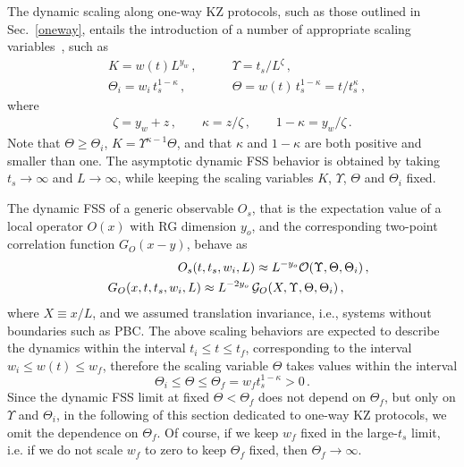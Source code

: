The dynamic scaling along one-way KZ protocols, such as those outlined
in Sec.~\ref{oneway}, entails the introduction of a number of
appropriate scaling variables~\cite{rossini2021coherent}, such as
\begin{eqnarray}
  &K = w(t) L^{y_w}\,, \qquad &\Upsilon = t_s/L^{\zeta}\,,  
  \label{KZscavar}\\
  &\Theta_i
  = w_i\, t_s^{1-\kappa} \,,\qquad &\Theta = w(t) \,
  t_s^{1-\kappa} = t / t_s^{\kappa} \,,\nonumber
\end{eqnarray}
where
\begin{eqnarray}
\zeta = y_w + z\,,\qquad 
\kappa = {z/\zeta} \,,\qquad
1-\kappa = {y_w/\zeta}\,.\label{KZexps}
\end{eqnarray}
Note that $\Theta\ge \Theta_i$, $K= \Upsilon^{\kappa-1}\Theta$, and
that $\kappa$ and $1-\kappa$ are both positive and smaller than one.
The asymptotic dynamic FSS behavior is obtained by taking
$t_s\to\infty$ and $L\to\infty$, while keeping the scaling variables
$K$, $\Upsilon$, $\Theta$ and $\Theta_i$ fixed.

The dynamic FSS of a generic observable $O_s$, that is the expectation
value of a local operator $O(x)$ with RG dimension $y_o$, and the
corresponding two-point correlation function $G_O(x-y)$, behave
as~\cite{rossini2021coherent}
\begin{eqnarray}
  && O_s(t,t_s,w_i,L) \approx L^{-y_o} {\cal
    O}(\Upsilon,\Theta,\Theta_i)\,,
  \label{magscao}\\
&&    G_O(x,t,t_s,w_i,L) \approx L^{-2y_o}\,
  {\cal G}_O(X,\Upsilon,\Theta,\Theta_i)\,,\qquad
  \label{G2scao}
\end{eqnarray}
where $X\equiv x/L$, and we assumed translation invariance, i.e.,
systems without boundaries such as PBC. The above scaling behaviors
are expected to describe the dynamics within the interval $t_i\le t
\le t_f$, corresponding to the interval $w_i\le w(t) \le w_f$,
therefore the scaling variable $\Theta$ takes values within the
interval
\begin{equation}
  \Theta_i \le \Theta \le \Theta_f = w_f t_s^{1-\kappa}>0\,.
  \label{intomega}
  \end{equation}
Since the dynamic FSS limit at fixed $\Theta<\Theta_f$ does not depend
on $\Theta_f$, but only on $\Upsilon$ and $\Theta_i$, in the following
of this section dedicated to one-way KZ protocols, we omit the
dependence on $\Theta_f$. Of course, if we keep $w_f$ fixed in the
large-$t_s$ limit, i.e. if we do not scale $w_f$ to zero to keep
$\Theta_f$ fixed, then $\Theta_f\to\infty$.

